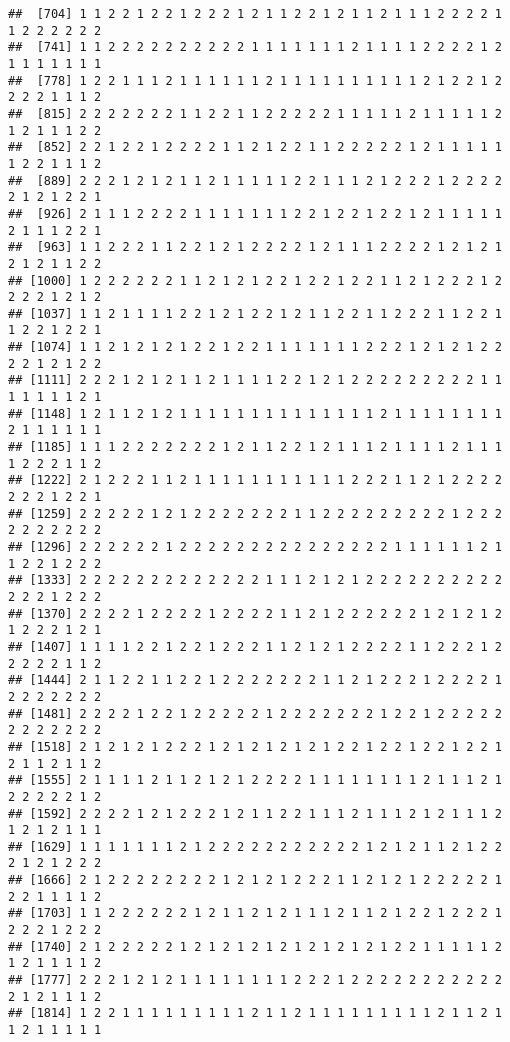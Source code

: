 \documentclass[
]{article}
\begin{document}
\begin{verbatim}
##  [704] 1 1 2 2 1 2 2 1 2 2 2 1 2 1 1 2 2 1 2 1 1 2 1 1 1 2 2 2 2 1 1 2 2 2 2 2 2
##  [741] 1 1 2 2 2 2 2 2 2 2 2 2 1 1 1 1 1 1 1 2 1 1 1 1 2 2 2 2 1 2 1 1 1 1 1 1 1
##  [778] 1 2 2 1 1 1 2 1 1 1 1 1 1 2 1 1 1 1 1 1 1 1 1 1 2 1 2 2 1 2 2 2 2 1 1 1 2
##  [815] 2 2 2 2 2 2 2 1 1 2 2 1 1 2 2 2 2 2 1 1 1 1 1 2 1 1 1 1 1 2 1 2 1 1 1 2 2
##  [852] 2 2 1 2 2 1 2 2 2 2 1 1 2 1 2 2 1 1 2 2 2 2 2 1 2 1 1 1 1 1 1 2 2 1 1 1 2
##  [889] 2 2 2 1 2 1 2 1 1 2 1 1 1 1 1 2 2 1 1 1 2 1 2 2 2 1 2 2 2 2 2 1 2 1 2 2 1
##  [926] 2 1 1 1 2 2 2 2 1 1 1 1 1 1 1 2 2 1 2 2 1 2 2 1 2 1 1 1 1 1 2 1 1 1 2 2 1
##  [963] 1 1 2 2 2 1 1 2 2 1 2 1 2 2 2 2 1 2 1 1 1 2 2 2 2 1 2 1 2 1 2 1 2 1 1 2 2
## [1000] 1 2 2 2 2 2 2 1 1 2 1 2 1 2 2 1 2 2 1 2 2 1 1 2 1 2 2 2 1 2 2 2 2 1 2 1 2
## [1037] 1 1 2 1 1 1 1 2 2 1 2 1 2 2 1 2 1 1 2 2 1 1 2 2 2 1 1 2 2 1 1 2 2 1 2 2 1
## [1074] 1 1 2 1 2 1 2 1 2 2 1 2 2 1 1 1 1 1 1 1 2 2 2 1 2 1 2 1 2 2 2 2 1 2 1 2 2
## [1111] 2 2 2 1 2 1 2 1 1 2 1 1 1 1 2 2 1 2 1 2 2 2 2 2 2 2 2 2 1 1 1 1 1 1 1 2 1
## [1148] 1 2 1 1 2 1 2 1 1 1 1 1 1 1 1 1 1 1 1 1 1 2 1 1 1 1 1 1 1 1 2 1 1 1 1 1 1
## [1185] 1 1 1 2 2 2 2 2 2 2 1 2 1 1 2 2 1 2 1 1 1 2 1 1 1 1 2 1 1 1 1 2 2 2 1 1 2
## [1222] 2 1 2 2 2 1 1 2 1 1 1 1 1 1 1 1 1 1 1 2 2 2 1 1 2 1 2 2 2 2 2 2 2 1 2 2 1
## [1259] 2 2 2 2 2 1 2 1 2 2 2 2 2 2 2 1 1 2 2 2 2 2 2 2 2 2 1 2 2 2 2 2 2 2 2 2 2
## [1296] 2 2 2 2 2 2 1 2 2 2 2 2 2 2 2 2 2 2 2 2 2 2 1 1 1 1 1 1 2 1 1 2 2 1 2 2 2
## [1333] 2 2 2 2 2 2 2 2 2 2 2 2 2 1 1 1 2 1 2 1 2 2 2 2 2 2 2 2 2 2 2 2 2 1 2 2 2
## [1370] 2 2 2 2 1 2 2 2 2 1 2 2 2 2 1 1 2 1 2 2 2 2 2 2 1 2 1 2 1 2 1 2 2 2 1 2 1
## [1407] 1 1 1 1 2 2 1 2 2 1 2 2 2 1 1 2 1 2 1 2 2 2 2 1 1 2 2 2 1 2 2 2 2 2 1 1 2
## [1444] 2 1 1 2 2 1 1 2 2 1 2 2 2 2 2 2 2 1 1 2 1 2 2 2 1 2 2 2 2 1 2 2 2 2 2 2 2
## [1481] 2 2 2 2 1 2 2 1 2 2 2 2 2 1 2 2 2 2 2 2 2 1 2 2 1 2 2 2 2 2 2 2 2 2 2 2 2
## [1518] 2 1 2 1 2 1 2 2 2 1 2 1 2 1 2 1 2 1 2 2 1 2 2 1 2 2 1 2 2 1 2 1 1 2 1 1 2
## [1555] 2 1 1 1 1 2 1 1 2 1 2 1 2 2 2 2 1 1 1 1 1 1 1 1 2 1 1 1 2 1 2 2 2 2 2 1 2
## [1592] 2 2 2 2 1 2 1 2 2 2 1 2 1 1 2 2 1 1 1 2 1 1 1 2 1 2 1 1 1 2 1 2 1 2 1 1 1
## [1629] 1 1 1 1 1 1 1 2 1 2 2 2 2 2 2 2 2 2 2 2 1 2 1 2 1 1 2 1 2 2 2 1 2 1 2 2 2
## [1666] 2 1 2 2 2 2 2 2 2 2 1 2 1 2 1 2 2 2 1 1 2 1 2 1 2 2 2 2 2 1 2 2 1 1 1 1 2
## [1703] 1 1 2 2 2 2 2 2 1 2 1 1 2 1 2 1 1 1 2 1 1 2 1 2 2 1 2 2 2 1 2 2 2 1 2 2 2
## [1740] 2 1 2 2 2 2 2 1 2 1 2 1 2 1 2 1 2 1 2 1 2 1 2 2 1 1 1 1 1 2 1 2 1 1 1 1 2
## [1777] 2 2 2 1 2 1 2 1 1 1 1 1 1 1 1 2 2 2 1 2 2 2 2 2 2 2 2 2 2 2 2 1 2 1 1 1 2
## [1814] 1 2 2 1 1 1 1 1 1 1 1 1 2 1 1 2 1 1 1 1 1 1 1 1 1 2 1 1 2 1 1 2 1 1 1 1 1

\end{verbatim}
\end{document}
